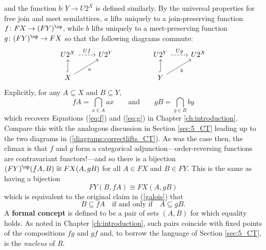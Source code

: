 and the function $b\colon Y\to U2^X$ is defined similarly. By the universal properties for free join and meet semilattices, $a$ lifts uniquely to a join-preserving function $f\colon FX\to (FY)^{\op}$, while $b$ lifts uniquely to a meet-preserving function $g\colon (FY)^{\op}\to FX$ so that the following diagrams commute:
\begin{equation}\label{diagrams:FCA}
  \begin{tikzcd}
  U2^X \arrow[r, "Uf", dashed]         & U2^Y && U2^Y \arrow[r, "Ug", dashed]         & U2^X \\
  X \arrow[ru, "a"'] \arrow[u, hook] &     && Y \arrow[u, hook] \arrow[ru, "b"'] &    
  \end{tikzcd}
\end{equation}
Explicitly, for any $A\subseteq X$ and $B\subseteq Y$,
\[
  fA= \bigcap_{x\in A}ax 
  \qquad\text{and}\qquad
  gB=\bigcap_{y\in B} by
\]
which recovers Equations (\ref{eq:f}) and (\ref{eq:g}) in Chapter \ref{ch:introduction}. Compare this with the analogous discussion in Section \ref{sec:5_CT} leading up to the two diagrams in (\ref{diagrams:correctlifts_CT}). As was the case then, the climax is that $f$ and $g$ form a categorical adjunction---order-reversing functions are contravariant functors!---and so there is a bijection $(FY)^{\op}(fA,B)\cong FX(A,gB)$ for all $A\in FX$ and $B\in FY$. This is the same as having a bijection
\[FY(B,fA)\cong FX(A,gB)\]
which is equivalent to the original claim in (\ref{galois}) that
\[B \subseteq fA  \quad \text{if and only if} \quad A\subseteq gB.\]
A \textbf{formal concept} is defined to be a pair of sets $(A,B)$ for which equality holds. As noted in Chapter \ref{ch:introduction}, such pairs coincide with fixed points of the compositions $fg$ and $gf$ and, to borrow the language of Section \ref{sec:5_CT}, is the \textit{nucleus} of $R$.




